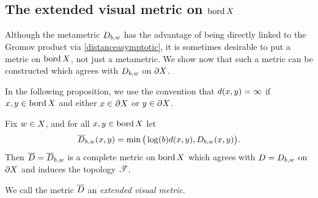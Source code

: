 
\subsection{The extended visual metric on $\operatorname{bord} X$}
\label{subsectionvisual}
Although the metametric $D_{b,w}$ has the advantage of being directly linked to the Gromov product via \eqref{distanceasymptotic}, it is sometimes desirable to put a metric on $\operatorname{bord} X$, not just a metametric. We show now that such a metric can be constructed which agrees with $D_{b,w}$ on $\partial X$.

In the following proposition, we use the convention that $d(x,y) = \infty$ if $x,y\in\operatorname{bord} X$ and either $x\in\partial X$ or $y\in\partial X$.

\begin{proposition}
\label{propositionwbarDist}
Fix $w\in X$, and for all $x,y\in \operatorname{bord} X$ let
\[
\overline{D}_{b,w}(x,y) = \min\big(\log(b)d(x,y), D_{b,w}(x,y)\big).
\]
Then $\overline{D} = \overline{D}_{b,w}$ is a complete metric on $\operatorname{bord} X$ which agrees with $D = D_{b,w}$ on $\partial X$ and induces the topology $\mathscr T$.
\end{proposition}
We call the metric $\overline{D}$ an \emph{extended visual metric}.

